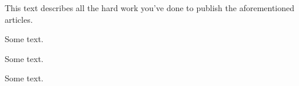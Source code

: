 This text describes all the hard work you've done to publish the aforementioned articles.

\begin{publikeenumerate}
\item Some text.
\item Some text.
\item Some text.
\end{publikeenumerate}